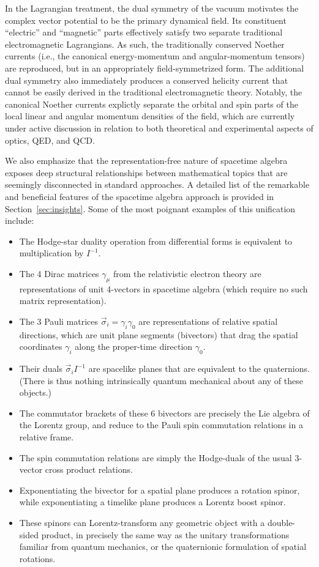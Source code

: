 \documentclass[1p,sort&compress]{elsarticle}
\numberwithin{equation}{section}
\newcommand{\rv}[1]{\vec{#1}}
\begin{document}
In the Lagrangian treatment, the dual symmetry of the vacuum motivates the complex vector potential to be the primary dynamical field.  Its constituent ``electric'' and ``magnetic'' parts effectively satisfy two separate traditional electromagnetic Lagrangians. As such, the traditionally conserved Noether currents (i.e., the canonical energy-momentum and angular-momentum tensors) are reproduced, but in an appropriately field-symmetrized form.  The additional dual symmetry also immediately produces a conserved helicity current that cannot be easily derived in the traditional electromagnetic theory. Notably, the canonical Noether currents explictly separate the orbital and spin parts of the local linear and angular momentum densities of the field, which are currently under active discussion in relation to both theoretical and experimental aspects of optics, QED, and QCD.

We also emphasize that the representation-free nature of spacetime algebra exposes deep structural relationships between mathematical topics that are seemingly disconnected in standard approaches. A detailed list of the remarkable and beneficial features of the spacetime algebra approach is provided in Section~\ref{sec:insights}. Some of the most poignant examples of this unification include: 
\begin{itemize}
  \item The Hodge-star duality operation from differential forms is equivalent to multiplication by $I^{-1}$.  
  \item The 4 Dirac matrices $\gamma_\mu$ from the relativistic electron theory are representations of unit 4-vectors in spacetime algebra (which require no such matrix representation).  
  \item The 3 Pauli matrices $\rv{\sigma}_i=\gamma_i\gamma_0$ are representations of relative spatial directions, which are unit plane segments (bivectors) that drag the spatial coordinates $\gamma_i$ along the proper-time direction $\gamma_0$. 
  \item Their duals $\rv{\sigma}_i I^{-1}$ are spacelike planes that are equivalent to the quaternions. (There is thus nothing intrinsically quantum mechanical about any of these objects.)  
  \item The commutator brackets of these 6 bivectors are precisely the Lie algebra of the Lorentz group, and reduce to the Pauli spin commutation relations in a relative frame.
  \item The spin commutation relations are simply the Hodge-duals of the usual 3-vector cross product relations.  
  \item Exponentiating the bivector for a spatial plane produces a rotation spinor, while exponentiating a timelike plane produces a Lorentz boost spinor.  
  \item These spinors can Lorentz-transform any geometric object with a double-sided product, in precisely the same way as the unitary transformations familiar from quantum mechanics, or the quaternionic formulation of spatial rotations.
\end{itemize}
\end{document}
